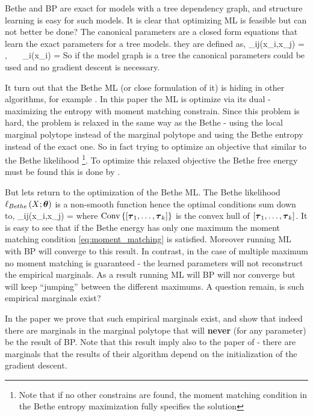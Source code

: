 Bethe and BP are exact for models with a tree dependency graph, and structure learning is easy for such models.
It is clear that optimizing ML is feasible but can not better be done?  
The canonical parameters are a closed form equations that learn the exact parameters for a tree models.
they are defined as,
\be
\label{eq:canonical}
\theta_{ij}(x_i,x_j) = , \ \ \ \theta_i(x_i) = 
\ee
So if the model graph is a tree the canonical parameters could be used and no gradient descent is necessary.

It turn out that the Bethe ML (or close formulation of it) is hiding in other algorithms, for example  \cite{ganapathi2012constrained}.
In this paper the ML is optimize via its dual - maximizing the entropy with moment matching constrain.
Since this problem is hard, the problem is relaxed in the same way as the Bethe - using the local marginal polytope  instead of the marginal polytope and using the Bethe entropy instead of the exact one.
So in fact trying to optimize an objective that similar to the Bethe likelihood \footnote{Note that if no other constrains are found, the moment matching condition in the Bethe entropy maximization fully specifies the solution}.
To optimize this relaxed objective the Bethe free energy must be found this is done by \cite{yuille2002cccp}.

But lets return to the optimization of the Bethe ML.
The Bethe likelihood $\ell_{Bethe}\left(X;\boldsymbol{\theta}\right)$ is a non-smooth function hence the optimal conditions sum down to,
\be
\label{eq:bethe_opt}
\mu_{ij}(x_i,x_j) = 
\ee
where $\text{Conv}\left\{[\boldsymbol{\tau}_1,\ldots,\boldsymbol{\tau}_k]\right\}$ is the convex hull of $[\boldsymbol{\tau}_1,\ldots,\boldsymbol{\tau}_k]$.
It is easy to see that if the Bethe energy has only one maximum the moment matching condition \eqref{eq:moment_matching} is satisfied.
Moreover running ML with BP will converge to this result.
In contrast, in the case of multiple maximum no moment matching is guaranteed - the learned parameters will not reconstruct the empirical marginals.
As a result running ML will BP will nor converge but will keep ``jumping'' between the different maximums. 
A question remain, is such empirical marginals exist?

In the paper \cite{heinemann2012cannot} we prove that such empirical marginals exist, and show that indeed there are marginals in the marginal polytope that will \textbf{never} (for any parameter) be the result of BP.
Note that this result imply also to the paper of \cite{ganapathi2012constrained} - there are marginals that the results of their algorithm depend on the initialization of the gradient descent.   

